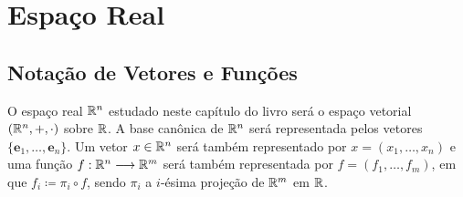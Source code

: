




































































































\chapter{Espaço Real}

\section{Notação de Vetores e Funções}

	O espaço real $\mathbb{R}^n$ estudado neste capítulo do livro será o espaço vetorial $(\mathbb{R}^n,+,\cdot)$ sobre $\mathbb{R}$. A base canônica de $\mathbb{R}^n$ será representada pelos vetores $\{\bm e_1, \ldots, \bm e_n\}$. Um vetor $x \in \mathbb{R}^n$ será também representado por $x=(x_1,\ldots,x_n)$ e uma função $f: \mathbb{R}^n \longrightarrow \mathbb{R}^m$ será também representada por $f=(f_1,\ldots,f_m)$, em que $f_i \coloneqq \pi_i \circ f$, sendo $\pi_i$ a $i$-ésima projeção de $\mathbb{R}^m$ em $\mathbb{R}$.

